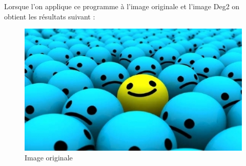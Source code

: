 \documentclass[12pt]{report}
\begin{document}
Lorsque l'on applique ce programme à l'image originale et l'image Deg2 on obtient les résultats suivant :

\begin{figure}[H]
\begin{center}
\includegraphics[scale=0.5]{../smiley.jpg} 
\caption{Image originale}
\end{center}
\end{figure}
\end{document}
